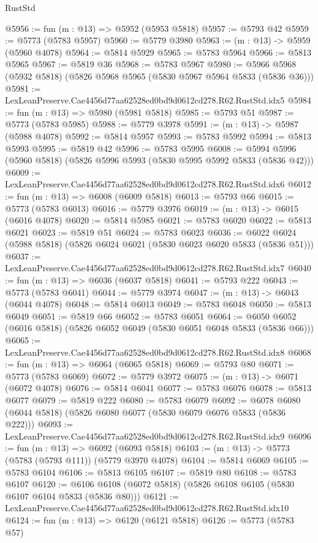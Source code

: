 \begin{lexlean}{RustStd}
\begin{coremodule}
@5956 := fun (m : @13) => @5952 (@5953 @5818)
@5957 := @5793 @42
@5959 := @5773 (@5783 @5957)
@5960 := @5779 @3980
@5963 := (m : @13) -> @5959 (@5960 @4078)
@5964 := @5814 @5929
@5965 := @5783 @5964
@5966 := @5813 @5965
@5967 := @5819 @36
@5968 := @5783 @5967
@5980 := @5966 @5968 (@5932 @5818) (@5826 @5968 @5965 (@5830 @5967 @5964 @5833 (@5836 @36)))
@5981 := LexLeanPreserve.Cae4456d77aa62528ed0bd9d0612cd278.R62.RustStd.idx5
@5984 := fun (m : @13) => @5980 (@5981 @5818)
@5985 := @5793 @51
@5987 := @5773 (@5783 @5985)
@5988 := @5779 @3978
@5991 := (m : @13) -> @5987 (@5988 @4078)
@5992 := @5814 @5957
@5993 := @5783 @5992
@5994 := @5813 @5993
@5995 := @5819 @42
@5996 := @5783 @5995
@6008 := @5994 @5996 (@5960 @5818) (@5826 @5996 @5993 (@5830 @5995 @5992 @5833 (@5836 @42)))
@6009 := LexLeanPreserve.Cae4456d77aa62528ed0bd9d0612cd278.R62.RustStd.idx6
@6012 := fun (m : @13) => @6008 (@6009 @5818)
@6013 := @5793 @66
@6015 := @5773 (@5783 @6013)
@6016 := @5779 @3976
@6019 := (m : @13) -> @6015 (@6016 @4078)
@6020 := @5814 @5985
@6021 := @5783 @6020
@6022 := @5813 @6021
@6023 := @5819 @51
@6024 := @5783 @6023
@6036 := @6022 @6024 (@5988 @5818) (@5826 @6024 @6021 (@5830 @6023 @6020 @5833 (@5836 @51)))
@6037 := LexLeanPreserve.Cae4456d77aa62528ed0bd9d0612cd278.R62.RustStd.idx7
@6040 := fun (m : @13) => @6036 (@6037 @5818)
@6041 := @5793 @222
@6043 := @5773 (@5783 @6041)
@6044 := @5779 @3974
@6047 := (m : @13) -> @6043 (@6044 @4078)
@6048 := @5814 @6013
@6049 := @5783 @6048
@6050 := @5813 @6049
@6051 := @5819 @66
@6052 := @5783 @6051
@6064 := @6050 @6052 (@6016 @5818) (@5826 @6052 @6049 (@5830 @6051 @6048 @5833 (@5836 @66)))
@6065 := LexLeanPreserve.Cae4456d77aa62528ed0bd9d0612cd278.R62.RustStd.idx8
@6068 := fun (m : @13) => @6064 (@6065 @5818)
@6069 := @5793 @80
@6071 := @5773 (@5783 @6069)
@6072 := @5779 @3972
@6075 := (m : @13) -> @6071 (@6072 @4078)
@6076 := @5814 @6041
@6077 := @5783 @6076
@6078 := @5813 @6077
@6079 := @5819 @222
@6080 := @5783 @6079
@6092 := @6078 @6080 (@6044 @5818) (@5826 @6080 @6077 (@5830 @6079 @6076 @5833 (@5836 @222)))
@6093 := LexLeanPreserve.Cae4456d77aa62528ed0bd9d0612cd278.R62.RustStd.idx9
@6096 := fun (m : @13) => @6092 (@6093 @5818)
@6103 := (m : @13) -> @5773 (@5783 (@5793 @111)) (@5779 @3970 @4078)
@6104 := @5814 @6069
@6105 := @5783 @6104
@6106 := @5813 @6105
@6107 := @5819 @80
@6108 := @5783 @6107
@6120 := @6106 @6108 (@6072 @5818) (@5826 @6108 @6105 (@5830 @6107 @6104 @5833 (@5836 @80)))
@6121 := LexLeanPreserve.Cae4456d77aa62528ed0bd9d0612cd278.R62.RustStd.idx10
@6124 := fun (m : @13) => @6120 (@6121 @5818)
@6126 := @5773 (@5783 @57)

\end{coremodule}
\end{lexlean}
